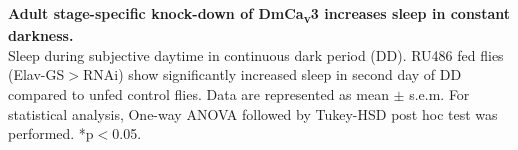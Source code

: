 \label{fig:S}
\textbf{Adult stage-specific knock-down of DmCa\textsubscript{v}3 increases sleep in constant darkness.}
\\
Sleep during subjective daytime in continuous dark period (DD). 
RU486 fed flies (Elav-GS$>$RNAi) show significantly increased sleep in second day of DD compared to unfed control flies.
Data are represented as mean $\pm$ s.e.m.
For statistical analysis, One-way ANOVA followed by Tukey-HSD post hoc test was performed.
*p$<$0.05.
  


  
  
  